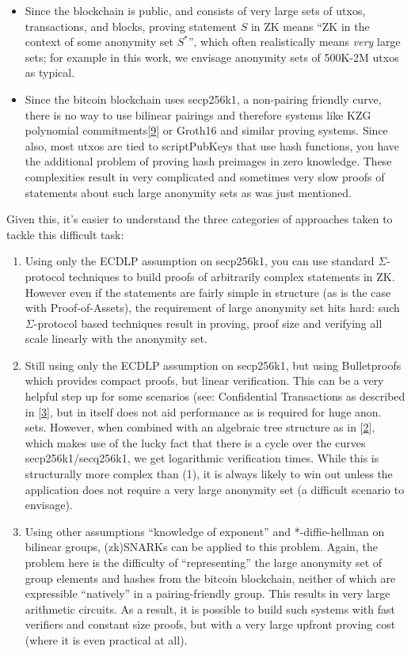 \documentclass[10pt,a4paper]{article}
\begin{document}
\begin{itemize}
\item Since the blockchain is public, and consists of very large sets of utxos, transactions, and blocks, proving statement $S$ in ZK means ``ZK in the context of some anonymity set $S^*$'', which often realistically means \emph{very} large sets; for example in this work, we envisage anonymity sets of 500K-2M utxos as typical.
\item Since the bitcoin blockchain uses secp256k1, a non-pairing friendly curve, there is no way to use bilinear pairings and therefore systems like KZG polynomial commitments{[}\protect\hyperlink{anchor-9}{9}{]} or Groth16 and similar proving systems. Since also, most utxos are tied to scriptPubKeys that use hash functions, you have the additional problem of proving hash preimages in zero knowledge. These complexities result in very complicated and sometimes very slow proofs of statements about such large anonymity sets as was just mentioned.
\end{itemize}

Given this, it's easier to understand the three categories of approaches taken to tackle this difficult task:

\begin{enumerate}
\item Using only the ECDLP assumption on secp256k1, you can use standard $\Sigma$-protocol techniques to build proofs of arbitrarily complex statements in ZK. However even if the statements are fairly simple in structure (as is the case with Proof-of-Assets), the requirement of large anonymity set hits hard: such $\Sigma$-protocol based techniques result in  proving, proof size and verifying all scale linearly with the anonymity set.
\item Still using only the ECDLP assumption on secp256k1, but using Bulletproofs which provides compact proofs, but linear verification. This can be a very helpful step up for some scenarios (see: Confidential Transactions as described in {[}\protect\hyperlink{anchor-3}{3}{]}, but in itself does not aid performance as is required for huge anon. sets. However, when combined with an algebraic tree structure as in {[}\protect\hyperlink{anchor-2}{2}{]}, which makes use of the lucky fact that there is a cycle over the curves secp256k1/secq256k1, we get logarithmic verification times. While this is structurally more complex than (1), it is always likely to win out unless the application does not require a very large anonymity set (a difficult scenario to envisage).
\item Using other assumptions ``knowledge of exponent'' and *-diffie-hellman on bilinear groups, (zk)SNARKs can be applied to this problem. Again, the problem here is the difficulty of ``representing'' the large anonymity set of group elements and hashes from the bitcoin blockchain, neither of which are expressible ``natively'' in a pairing-friendly group. This results in very large arithmetic circuits. As a result, it is possible to build such systems with fast verifiers and constant size proofs, but with a very large upfront proving cost (where it is even practical at all).
\end{enumerate}
\end{document}
